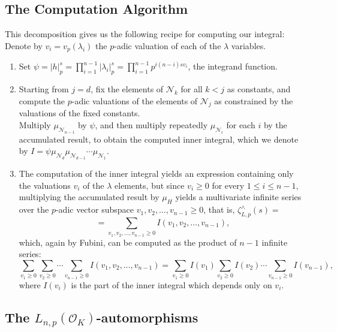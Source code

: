 \documentclass{article}
\begin{document}
\subsection{The Computation Algorithm}
This decomposition gives us the following recipe for computing our integral:\\
Denote by $v_i=v_p(\lambda_i)$ the $p$-adic valuation of each of the $\lambda$ variables.
\begin{enumerate}
    \item Set $\psi=|h|_p^s=\prod_{i=1}^{n-1}|\lambda_i|_p^s=\prod_{i=1}^{n-1}p^{i(n-i)sv_i}$, the integrand function.
    \item Starting from $j=d$, fix the elements of $\mathcal{N}_k$ for all $k<j$ as constants, and compute the $p$-adic valuations of the elements of $\mathcal{N}_j$ as constrained by the valuations of the fixed constants.\\
    Multiply $\mu_{\mathcal{N}_{n-1}}$ by $\psi$, and then multiply repeatedly $\mu_{\mathcal{N}_i}$ for each $i$ by the accumulated result, to obtain the computed inner integral, which we denote by $I=\psi\mu_{\mathcal{N}_d}\mu_{\mathcal{N}_{d-1}}\cdots\mu_{\mathcal{N}_1}$.
    \item The computation of the inner integral yields an expression containing only the valuations $v_i$ of the $\lambda$ elements, but since $v_i\geq{0}$ for every $1\leq{i}\leq{n-1}$, multiplying the accumulated result by $\mu_H$ yields a multivariate infinite series over the $p$-adic vector subspace $v_1,v_2,\dots,v_{n-1}\geq{0}$, that is, $\zeta_{L,p}^{\wedge}(s)=$
    \[=\sum_{v_1,v_2,\dots,v_{n-1}\geq{0}}I(v_1,v_2,\dots,v_{n-1}),\]
    which, again by Fubini, can be computed as the product of $n-1$ infinite series:
    \[\sum_{v_1\geq{0}}\sum_{v_2\geq{0}}\cdots\sum_{v_{n-1}\geq{0}}I(v_1,v_2,\dots,v_{n-1})=\sum_{v_1\geq{0}}I(v_1)\sum_{v_2\geq{0}}I(v_2)\cdots\sum_{v_{n-1}\geq{0}}I(v_{n-1}),\]
    where $I(v_i)$ is the part of the inner integral which depends only on $v_i$.
    \end{enumerate}
\subsection{The $L_{n,p}(\mathcal{O}_K)$-automorphisms}
\end{document}
